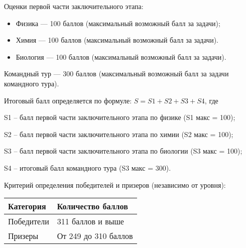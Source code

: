 Оценки первой части заключительного этапа:
\begin{itemize}
    \item Физика — 100 баллов (максимальный возможный балл за задачи);
    \item Химия — 100 баллов (максимальный возможный балл за задачи).
    \item Биология — 100 баллов (максимальный возможный балл за задачи).
\end{itemize}
 
Командный тур — 300 баллов (максимальный возможный балл за задачи командного тура).

Итоговый балл определяется по формуле: $S = S1 + S2 + S3 + S4$, где

S1 – балл первой части заключительного этапа по физике (S1 макс = 100);

S2 – балл первой части заключительного этапа по химии (S2 макс = 100);

S3 – балл первой части заключительного этапа по биологии (S3 макс = 100);

S4 – итоговый балл командного тура (S3 макс = 300).

Критерий определения победителей и призеров (независимо от уровня):
\begin{center}
    \begin{tabular}{|l|l|}
        \hline
        Категория&Количество баллов\\
        \hline
        Победители&311 баллов и выше\\
        \hline
        Призеры&От 249 до 310 баллов\\
        \hline
    \end{tabular}
\end{center}